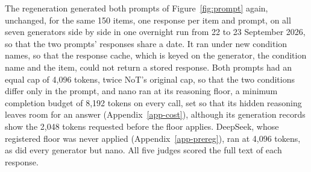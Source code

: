 The regeneration generated both prompts of Figure~\ref{fig:prompt} again,
unchanged, for the same 150 items, one response per item and prompt, on all
seven generators side by side in one overnight run from 22 to 23 September
2026, so that the two prompts' responses share a date.
It ran under new condition names, so that the response cache, which is keyed
on the generator, the condition name and the item, could not return a stored
response.
Both prompts had an equal cap of 4,096 tokens, twice NoT's original cap, so
that the two conditions differ only in the prompt, and nano ran at its
reasoning floor, a minimum completion budget of 8,192 tokens on every call,
set so that its hidden reasoning leaves room for an answer
(Appendix~\ref{app-cost}), although its generation records show the 2,048
tokens requested before the floor applies.
DeepSeek, whose registered floor was never applied (Appendix~\ref{app-prereg}),
ran at 4,096 tokens, as did every generator but nano.
All five judges scored the full text of each response.

